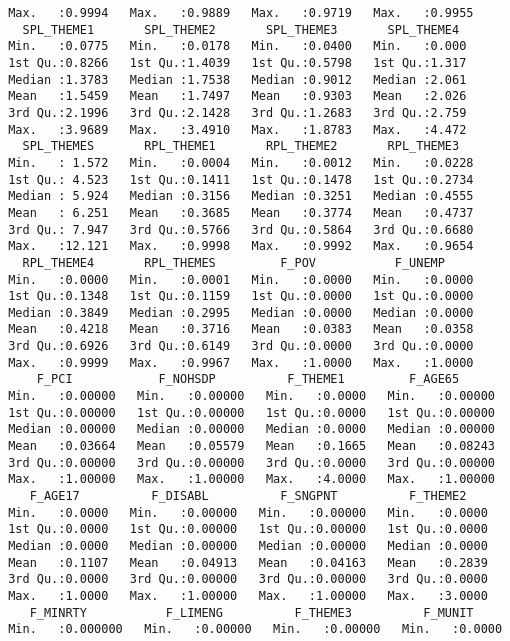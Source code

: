 \documentclass[
  12pt,
]{article}
\begin{document}
\begin{verbatim}
 Max.   :0.9994   Max.   :0.9889   Max.   :0.9719   Max.   :0.9955  
   SPL_THEME1       SPL_THEME2       SPL_THEME3       SPL_THEME4   
 Min.   :0.0775   Min.   :0.0178   Min.   :0.0400   Min.   :0.000  
 1st Qu.:0.8266   1st Qu.:1.4039   1st Qu.:0.5798   1st Qu.:1.317  
 Median :1.3783   Median :1.7538   Median :0.9012   Median :2.061  
 Mean   :1.5459   Mean   :1.7497   Mean   :0.9303   Mean   :2.026  
 3rd Qu.:2.1996   3rd Qu.:2.1428   3rd Qu.:1.2683   3rd Qu.:2.759  
 Max.   :3.9689   Max.   :3.4910   Max.   :1.8783   Max.   :4.472  
   SPL_THEMES       RPL_THEME1       RPL_THEME2       RPL_THEME3    
 Min.   : 1.572   Min.   :0.0004   Min.   :0.0012   Min.   :0.0228  
 1st Qu.: 4.523   1st Qu.:0.1411   1st Qu.:0.1478   1st Qu.:0.2734  
 Median : 5.924   Median :0.3156   Median :0.3251   Median :0.4555  
 Mean   : 6.251   Mean   :0.3685   Mean   :0.3774   Mean   :0.4737  
 3rd Qu.: 7.947   3rd Qu.:0.5766   3rd Qu.:0.5864   3rd Qu.:0.6680  
 Max.   :12.121   Max.   :0.9998   Max.   :0.9992   Max.   :0.9654  
   RPL_THEME4       RPL_THEMES         F_POV           F_UNEMP      
 Min.   :0.0000   Min.   :0.0001   Min.   :0.0000   Min.   :0.0000  
 1st Qu.:0.1348   1st Qu.:0.1159   1st Qu.:0.0000   1st Qu.:0.0000  
 Median :0.3849   Median :0.2995   Median :0.0000   Median :0.0000  
 Mean   :0.4218   Mean   :0.3716   Mean   :0.0383   Mean   :0.0358  
 3rd Qu.:0.6926   3rd Qu.:0.6149   3rd Qu.:0.0000   3rd Qu.:0.0000  
 Max.   :0.9999   Max.   :0.9967   Max.   :1.0000   Max.   :1.0000  
     F_PCI            F_NOHSDP          F_THEME1         F_AGE65       
 Min.   :0.00000   Min.   :0.00000   Min.   :0.0000   Min.   :0.00000  
 1st Qu.:0.00000   1st Qu.:0.00000   1st Qu.:0.0000   1st Qu.:0.00000  
 Median :0.00000   Median :0.00000   Median :0.0000   Median :0.00000  
 Mean   :0.03664   Mean   :0.05579   Mean   :0.1665   Mean   :0.08243  
 3rd Qu.:0.00000   3rd Qu.:0.00000   3rd Qu.:0.0000   3rd Qu.:0.00000  
 Max.   :1.00000   Max.   :1.00000   Max.   :4.0000   Max.   :1.00000  
    F_AGE17          F_DISABL          F_SNGPNT          F_THEME2     
 Min.   :0.0000   Min.   :0.00000   Min.   :0.00000   Min.   :0.0000  
 1st Qu.:0.0000   1st Qu.:0.00000   1st Qu.:0.00000   1st Qu.:0.0000  
 Median :0.0000   Median :0.00000   Median :0.00000   Median :0.0000  
 Mean   :0.1107   Mean   :0.04913   Mean   :0.04163   Mean   :0.2839  
 3rd Qu.:0.0000   3rd Qu.:0.00000   3rd Qu.:0.00000   3rd Qu.:0.0000  
 Max.   :1.0000   Max.   :1.00000   Max.   :1.00000   Max.   :3.0000  
    F_MINRTY           F_LIMENG          F_THEME3          F_MUNIT      
 Min.   :0.000000   Min.   :0.00000   Min.   :0.00000   Min.   :0.0000  

\end{verbatim}
\end{document}
